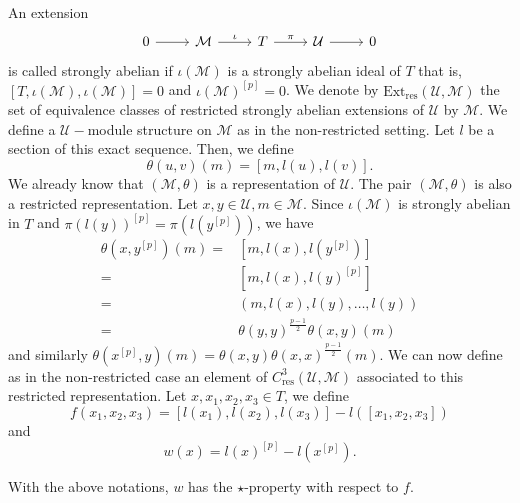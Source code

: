 \documentclass[11pt, twoside]{article}
\begin{document}
An extension \[\begin{tikzcd}
	0 & \mathcal{M} & T & {\mathcal{U}} & 0
	\arrow[from=1-1, to=1-2]
	\arrow["\iota", from=1-2, to=1-3]
	\arrow["\pi", from=1-3, to=1-4]
	\arrow[from=1-4, to=1-5]
\end{tikzcd}\] is called strongly abelian if $\iota(\mathcal{M}) $ is a strongly abelian ideal of $T$ that is, $[T,\iota(\mathcal{M}),\iota(\mathcal{M})]=0 $ and $\iota(\mathcal{M})^{[p]}=0 $. We denote by $\mathrm{Ext}_\mathrm{res}(\mathcal{U},\mathcal{M}) $ the set of equivalence classes of restricted strongly abelian extensions of $\mathcal{U} $ by $\mathcal{M}$. We define a $\mathcal{U}-$module structure on $\mathcal{M}$ as in the non-restricted setting. Let $l $ be a section of this exact sequence. Then, we define $$\theta(u,v)(m)=[m,l(u),l(v)]. $$ We already know that $(\mathcal{M},\theta)$ is a representation of $\mathcal{U}$. The pair $(\mathcal{M},\theta)$ is also a restricted representation. Let $x,y\in \mathcal{U},m\in \mathcal{M}$. Since $\iota(\mathcal{M})$ is strongly abelian in $T$ and $\pi(l(y))^{[p]}=\pi(l(y^{[p]})) $, we have \begin{align*}
    \theta(x,y^{[p]})(m)=& [m,l(x),l(y^{[p]})]\\ =& [m,l(x),l(y)^{[p]}]\\ =& (m,l(x),l(y),\ldots,l(y))\\ =& \theta(y,y)^\frac{p-1}{2}\theta(x,y)(m)
\end{align*} and similarly $\theta(x^{[p]},y)(m)= \theta(x,y)\theta(x,x)^\frac{p-1}{2}(m) $. We can now define as in the non-restricted case an element of $C^3_\mathrm{res}(\mathcal{U},\mathcal{M}) $ associated to this restricted representation. Let $x,x_1,x_2,x_3\in T $, we define $$f(x_1,x_2,x_3)= [l(x_1),l(x_2),l(x_3)]-l([x_1,x_2,x_3]) $$ and $$w(x)= l(x)^{[p]}-l(x^{[p]}). $$ 
\begin{prop}
    With the above notations, $w$ has the $\star$-property with respect to $f$.
\end{prop}
\end{document}
